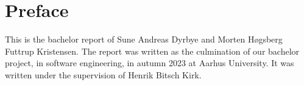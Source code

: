 \newpage
\section{Preface}

This is the bachelor report of Sune Andreas Dyrbye and Morten Høgsberg Futtrup
Kristensen. The report was written as the culmination of our bachelor project, in
software engineering, in
autumn 2023 at Aarhus University. It was written under the supervision of Henrik
Bitsch Kirk.

\newpage
